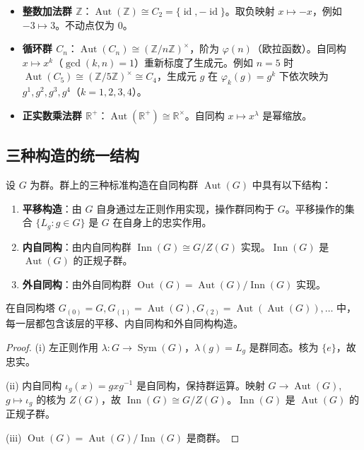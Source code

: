 \begin{example}[外自同构的实例]\label{ex:scaling_operation_examples}
\begin{itemize}
    \item \textbf{整数加法群 $\mathbb{Z}$}：$\operatorname{Aut}(\mathbb{Z}) \cong C_2 = \{\operatorname{id}, -\operatorname{id}\}$。取负映射 $x \mapsto -x$，例如 $-3 \mapsto 3$。不动点仅为 $0$。
    \item \textbf{循环群 $C_n$}：$\operatorname{Aut}(C_n) \cong (\mathbb{Z}/n\mathbb{Z})^\times$，阶为 $\varphi(n)$（欧拉函数）。自同构 $x \mapsto x^k$（$\gcd(k,n)=1$）重新标度了生成元。例如 $n=5$ 时 $\operatorname{Aut}(C_5)\cong(\mathbb{Z}/5\mathbb{Z})^\times\cong C_4$，生成元 $g$ 在 $\varphi_k(g)=g^k$ 下依次映为 $g^1,g^2,g^3,g^4$（$k=1,2,3,4$）。
    \item \textbf{正实数乘法群 $\mathbb{R}^+$}：$\operatorname{Aut}(\mathbb{R}^+) \cong \mathbb{R}^\times$。自同构 $x \mapsto x^\lambda$ 是幂缩放。
\end{itemize}
\end{example}

\subsection{三种构造的统一结构}

\begin{theorem}[群上三种构造的统一结构定理]\label{thm:three_operations_unity}
设 $G$ 为群。群上的三种标准构造在自同构群 $\operatorname{Aut}(G)$ 中具有以下结构：
\begin{enumerate}[label=(\roman*)]
    \item \textbf{平移构造}：由 $G$ 自身通过左正则作用实现，操作群同构于 $G$。平移操作的集合 $\{L_g : g \in G\}$ 是 $G$ 在自身上的忠实作用。
    \item \textbf{内自同构}：由内自同构群 $\operatorname{Inn}(G) \cong G/Z(G)$ 实现。$\operatorname{Inn}(G)$ 是 $\operatorname{Aut}(G)$ 的正规子群。
    \item \textbf{外自同构}：由外自同构群 $\operatorname{Out}(G) = \operatorname{Aut}(G)/\operatorname{Inn}(G)$ 实现。
\end{enumerate}
在自同构塔 $G_{(0)} = G, G_{(1)} = \operatorname{Aut}(G), G_{(2)} = \operatorname{Aut}(\operatorname{Aut}(G)), \dots$ 中，每一层都包含该层的平移、内自同构和外自同构构造。
\end{theorem}

\begin{proof}
(i) 左正则作用 $\lambda: G \to \operatorname{Sym}(G)$，$\lambda(g) = L_g$ 是群同态。核为 $\{e\}$，故忠实。

(ii) 内自同构 $\iota_g(x) = gxg^{-1}$ 是自同构，保持群运算。映射 $G \to \operatorname{Aut}(G)$, $g \mapsto \iota_g$ 的核为 $Z(G)$，故 $\operatorname{Inn}(G) \cong G/Z(G)$。$\operatorname{Inn}(G)$ 是 $\operatorname{Aut}(G)$ 的正规子群。

(iii) $\operatorname{Out}(G) = \operatorname{Aut}(G)/\operatorname{Inn}(G)$ 是商群。
\end{proof}

